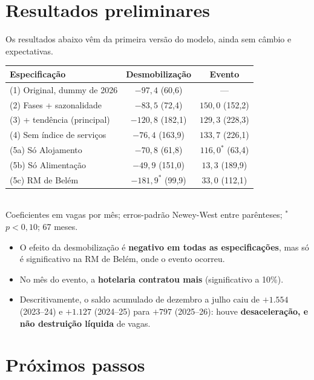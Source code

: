 \documentclass[11pt,a4paper]{article}
\begin{document}
\section{Resultados preliminares}

Os resultados abaixo vêm da primeira versão do modelo, ainda sem câmbio e expectativas.

\begin{table}[H]
\centering\small
\begin{tabularx}{\linewidth}{Lcc}
\toprule
\textbf{Especificação} & \textbf{Desmobilização} & \textbf{Evento}\\
\midrule
(1) Original, dummy de 2026 & $-97{,}4$ \;(60,6) & ---\\
(2) Fases + sazonalidade & $-83{,}5$ \;(72,4) & $150{,}0$ \;(152,2)\\
(3) + tendência (principal) & $-120{,}8$ \;(182,1) & $129{,}3$ \;(228,3)\\
(4) Sem índice de serviços & $-76{,}4$ \;(163,9) & $133{,}7$ \;(226,1)\\
(5a) Só Alojamento & $-70{,}8$ \;(61,8) & $116{,}0^{*}$ \;(63,4)\\
(5b) Só Alimentação & $-49{,}9$ \;(151,0) & $13{,}3$ \;(189,9)\\
(5c) RM de Belém & $-181{,}9^{*}$ \;(99,9) & $33{,}0$ \;(112,1)\\
\bottomrule
\end{tabularx}\\[3pt]
{\footnotesize Coeficientes em vagas por mês; erros-padrão Newey-West entre parênteses; $^{*}$ $p<0{,}10$; 67 meses.}
\end{table}

\begin{itemize}
  \item O efeito da desmobilização é \textbf{negativo em todas as especificações}, mas só é
        significativo na RM de Belém, onde o evento ocorreu.
  \item No mês do evento, a \textbf{hotelaria contratou mais} (significativo a 10\%).
  \item Descritivamente, o saldo acumulado de dezembro a julho caiu de $+1.554$ (2023--24) e $+1.127$
        (2024--25) para $+797$ (2025--26): houve \textbf{desaceleração, e não destruição líquida} de vagas.
\end{itemize}

\section{Próximos passos}
\end{document}
